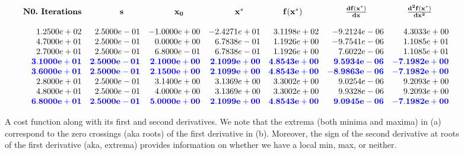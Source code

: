 \begin{equation}
\begin{array}{rrrrrrr}
\text{\bf N0.~Iterations} & \mathbf{s} \hspace*{7mm} & \mathbf{x_0} \hspace*{7mm}& \mathbf{x^\ast} \hspace*{7mm} & \mathbf{f(x^\ast)} \hspace*{7mm} & \mathbf{\frac{d f(x^\ast)}{dx}} \hspace*{7mm}
& \mathbf{\frac{d^2 f(x^\ast)}{dx^2}} \hspace*{7mm}\\
\\
1.2500e+02 & 2.5000e-01 & -1.0000e+00 & -2.4271e+01 & 3.1198e+02 & -9.2124e-06 & 4.3033e+00 \\
4.7000e+01 & 2.5000e-01 & 0.0000e+00 & 6.7838e-01 & 1.1926e+00 & -9.7541e-06 & 1.1085e+01 \\
2.7000e+01 & 2.5000e-01 & 6.8000e-01 & 6.7838e-01 & 1.1926e+00 & 7.6022e-06 & 1.1085e+01 \\
\color{blue} \bf 3.1000e+01 & \color{blue} \bf 2.5000e-01 & \color{blue} \bf 2.1000e+00 & \color{blue} \bf 2.1099e+00 & \color{blue} \bf  4.8543e+00 & \color{blue} \bf  9.5934e-06 & \color{blue} \bf  -7.1982e+00 \\
\color{blue} \bf  3.6000e+01 & \color{blue} \bf  2.5000e-01 & \color{blue} \bf 2.1500e+00 & \color{blue} \bf 2.1099e+00 &\color{blue} \bf  4.8543e+00 & \color{blue} \bf -8.9863e-06 & \color{blue} \bf -7.1982e+00 \\
2.8000e+01 & 2.5000e-01 & 3.1400e+00 & 3.1369e+00 & 3.3002e+00 & 9.0254e-06 & 9.2093e+00 \\
4.8000e+01 & 2.5000e-01 & 4.0000e+00 & 3.1369e+00 & 3.3002e+00 & 9.9328e-06 & 9.2093e+00 \\
\color{blue} \bf 6.8000e+01 & \color{blue} \bf 2.5000e-01 & \color{blue} \bf 5.0000e+00 & \color{blue} \bf 2.1099e+00 & \color{blue} \bf  4.8543e+00 & \color{blue} \bf 9.0945e-06 & \color{blue} \bf -7.1982e+00 \\
\end{array}
\end{equation}


\begin{figure}[htb]%
\centering
\centering
{}%
\hspace{5pt}%
%
\hspace{5pt}%
%
\caption[]{A cost function along with its first and second derivatives. We note that the extrema (both minima and maxima) in (a) correspond to the zero crossings (aka roots) of the first derivative in (b). Moreover, the sign of the second derivative at roots of the first derivative (aka, extrema) provides information on whether we have a local min, max, or neither.}
    \label{fig:ScalarCostsDerivativesPlot}
\end{figure}


